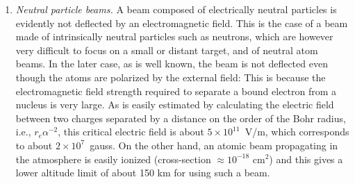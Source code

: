 \documentclass [12pt,a4paper,     ]{report} %
\begin{document}
\begin{enumerate}

\item \emph{Neutral particle beams.}  A beam composed of electrically neutral particles is evidently not deflected by an electromagnetic field. This is the case of a beam made of intrinsically neutral particles such as neutrons, which are however very difficult to focus on a small or distant target, and of neutral atom beams.  In the later case, as is well known, the beam is not deflected even though the atoms are polarized by the external field:  This is because the electromagnetic field strength required to separate a bound electron from a nucleus is very large. As is easily estimated by calculating the electric field between two charges separated by a distance on the order of the Bohr radius, i.e., $r_e\alpha^{-2}$, this critical electric field is about $5 \times 10^{11}$~V/m, which corresponds to about $2 \times 10^{7}$~gauss.  On the other hand, an atomic beam propagating in the atmosphere is easily ionized (cross-section $\approx 10^{-18}$ cm$^2$) and this gives a lower altitude limit of about 150 km for using such a beam.


\end{enumerate}
\end{document}
